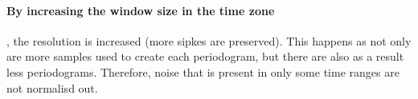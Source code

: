 \documentclass[main.tex]{subfiles}
\begin{document}
\paragraph{By increasing the window size in the time zone}, the resolution is increased (more sipkes are preserved). This happens as not only are more samples used to create each periodogram, but there are also as a result less periodograms. Therefore, noise that is present in only some time ranges are not normalisd out.



\clearpage
\end{document}
